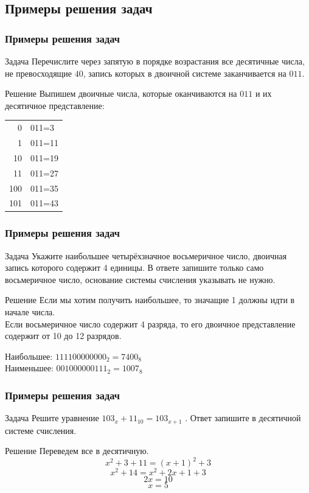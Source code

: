 \subsection{Примеры решения задач}

\begin{frame}
  \frametitle{Примеры решения задач}
	\begin{block}{Задача}
	Перечислите через запятую в порядке возрастания все десятичные числа, не превосходящие $40$, запись которых в двоичной системе заканчивается на $011$.

	\end{block}
	\pause
	\begin{block}{Решение}
Выпишем двоичные числа, которые оканчиваются на $011$ и их десятичное представление:

\begin{tabular}{r|l}
0 & 011=3\tabularnewline
1 & 011=11\tabularnewline
10 & 011=19\tabularnewline
11 & 011=27\tabularnewline
100 & 011=35\tabularnewline
101 & 011=43\tabularnewline
\end{tabular}


	\end{block}
	
\end{frame}

\begin{frame}
  \frametitle{Примеры решения задач}
	\begin{block}{Задача}
	Укажите наибольшее четырёхзначное восьмеричное число, двоичная запись которого содержит 4 единицы. В ответе запишите только само восьмеричное число, основание системы счисления указывать не нужно.
	\end{block}
	\pause
	\begin{block}{Решение}
Если мы хотим получить наибольшее, то значащие 1 должны идти в начале числа. \\
Если восьмеричное число содержит 4 разряда, то его двоичное представление содержит от 10 до 12 разрядов.

Наибольшее: $111100000000_2=7400_8$\\ \pause
Наименьшее: $001000000111_2=1007_8$\\

	\end{block}
	
\end{frame}

\begin{frame}
  \frametitle{Примеры решения задач}
	\begin{block}{Задача}
	Решите уравнение $103_x+11_{10}=103_{x+1}$ . Ответ запишите в десятичной системе счисления. 
	\end{block}
	\pause
	\begin{block}{Решение}
Переведем все в десятичную.
$$ x^2+3+11=(x+1)^2+3$$
$$ x^2+14=x^2+2x+1+3$$
$$ 2x=10 $$
$$ x=5 $$
	\end{block}
	
\end{frame}

